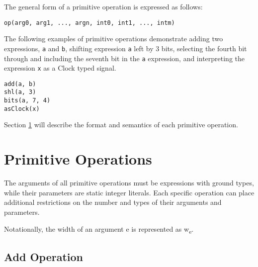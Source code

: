 \documentclass[12pt]{article}
\begin{document}
The general form of a primitive operation is expressed as follows:
\begin{lstlisting}
op(arg0, arg1, ..., argn, int0, int1, ..., intm)
\end{lstlisting}

The following examples of primitive operations demonstrate adding two expressions, \verb|a| and \verb|b|, shifting expression \verb|a| left by 3 bits, selecting the fourth bit through and including the seventh bit in the \verb|a| expression, and interpreting the expression \verb|x| as a Clock typed signal.
\begin{lstlisting}
add(a, b)
shl(a, 3)
bits(a, 7, 4)
asClock(x)
\end{lstlisting}

Section \ref{primitives} will describe the format and semantics of each primitive operation.

\section{Primitive Operations} \label{primitives}

\newcommand{\vv}[1]{{\ttfamily #1}}
\newcommand{\ts}[1]{\textsubscript{#1}}
\newcommand{\nf}[1]{\normalfont{\textbf{#1}}}
\newcommand{\nit}[1]{\normalfont{\textit{#1}}}
\newcommand{\mrow}[2]{\multirow{#1}{*}{#2}}
\newcommand{\mcol}[3]{\multicolumn{#1}{#2}{#3}}
\newcommand{\opheader}{
  \hline
  \mrow{2}{\nf{Name}} & \mrow{2}{\nf{Arguments}} & \mrow{2}{\nf{Parameters}} & \mrow{2}{\nf{Arg Types}} & \multicolumn{2}{c|}{\nf{Result}} \\
                      &                          &                           &                          & \mcol{1}{c}{\nit{Type}} & \mcol{1}{c|}{\nit{Width}} \\
  \hline
}

The arguments of all primitive operations must be expressions with ground types, while their parameters are static integer literals. Each specific operation can place additional restrictions on the number and types of their arguments and parameters.

Notationally, the width of an argument \vv{e} is represented as \vv{w}\ts{e}.

\subsection{Add Operation}
\end{document}
